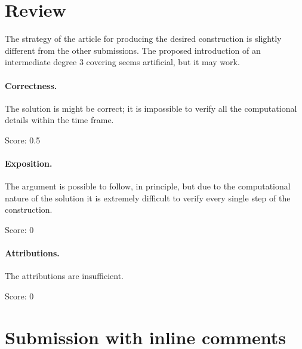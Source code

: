 \documentclass[11pt]{article}
\theoremstyle{remark}
\begin{document}
\maketitle

\section{Review}
The strategy of the article for producing the desired construction is slightly different from the other submissions. The proposed introduction of an intermediate degree 3 covering seems artificial, but it may work.

\paragraph{Correctness.}

 The solution is might be correct; it is impossible to verify all the computational details within the time frame. 

\noindent Score: 0.5

\paragraph{Exposition.}

The argument is possible to follow, in principle, but due to the computational nature of the solution it is extremely difficult to verify every single step of the construction. 

\noindent Score: 0

\paragraph{Attributions.}

The attributions are insufficient.

\noindent Score: 0


\newpage
\section{Submission with inline comments}


\begin{abstract}
Let a quadratic rational map have a critical point of exact period four, with its other critical value outside that cycle. Mark the cycle and the additional critical value. We describe a simple closed curve whose squared Dehn twist preserves the associated Teichm\"uller deformation space and has an infinite orbit on its connected components. After normalizing the cycle to $0,\infty,1,t$, the curve is obtained by transporting an upper semicircle from the parameter $t=3$. An explicit finite covering of ordered moduli identifies the stabilizer of the component containing the rational structure. A winding number on a further three-sheeted covering vanishes on this stabilizer and is nonzero on the squared twist. The construction applies to every admissible complex parameter.
\end{abstract}
\end{document}
